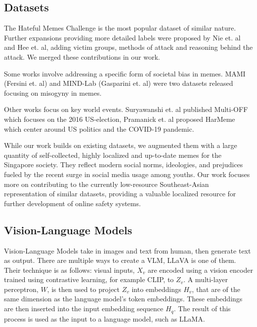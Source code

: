 \subsection{Datasets}
The Hateful Memes Challenge\cite{kiela2021hateful} is the most popular dataset of similar nature. Further expansions providing more detailed labels were proposed by Nie et. al\cite{hatefulmemes_finegrained} and Hee et. al\cite{HatReD}, adding victim groups, methods of attack and reasoning behind the attack. We merged these contributions in our work.
\\
\par
Some works involve addressing a specific form of societal bias in memes. MAMI (Fersini et. al)\cite{fersini-etal-2022-semeval} and MIND-Lab (Gasparini et. al)\cite{MIND} were two datasets released focusing on misogyny in memes.
\\
\par
Other works focus on key world events. Suryawanshi et. al published Multi-OFF\cite{MultiOFF} which focuses on the 2016 US-election, Pramanick et. al proposed HarMeme\cite{MOMENTA} which center around US politics and the COVID-19 pandemic.
\\
\par
While our work builds on existing datasets, we augmented them with a large quantity of self-collected, highly localized and up-to-date memes for the Singapore society. They reflect modern social norms, ideologies, and prejudices fueled by the recent surge in social media usage among youths. Our work focuses more on contributing to the currently low-resource Southeast-Asian representation of similar datasets, providing a valuable localized resource for further development of online safety systems.

\subsection{Vision-Language Models}
Vision-Language Models take in images and text from human, then generate text as output. There are multiple ways to create a VLM, LLaVA\cite{liu2023llava} is one of them. Their technique is as follows: visual inputs, $X_v$ are encoded using a vision encoder trained using contrastive learning, for example CLIP\cite{clip}, to $Z_v$. A multi-layer perceptron, $W$, is then used to project $Z_v$ into embeddings $H_v$, that are of the same dimension as the language model's token embeddings. These embeddings are then inserted into the input embedding sequence $H_q$. The result of this process is used as the input to a language model, such as LLaMA\cite{touvron2023llama}.

